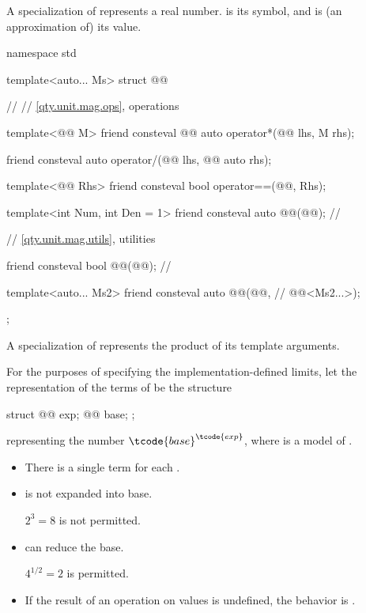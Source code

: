 A specialization of  represents a real number.
 is its symbol, and
 is (an approximation of) its value.

\begin{codeblock}
namespace std {

template<auto... Ms>
struct @@ {  // \expos
  // \ref{qty.unit.mag.ops}, operations

  template<@@ M>
  friend consteval @@ auto operator*(@@ lhs, M rhs);

  friend consteval auto operator/(@@ lhs, @@ auto rhs);

  template<@@ Rhs>
  friend consteval bool operator==(@@, Rhs);

  template<int Num, int Den = 1>
  friend consteval auto @@(@@);                         // \expos

  // \ref{qty.unit.mag.utils}, utilities

  friend consteval bool @@(@@);  // \expos

  template<auto... Ms2>
  friend consteval auto @@(@@,             // \expos
                                         @@<Ms2...>);
};

}
\end{codeblock}

\pnum
A specialization of 
represents the product of its template arguments.

\pnum
For the purposes of specifying the implementation-defined limits,
let the representation of the terms of  be the structure
\begin{codeblock}
struct {
  @@ exp;
  @@ base;
};
\end{codeblock}
representing the number $\tcode{base}^\tcode{exp}$,
where  is a model of .
\begin{itemize}
\item
There is a single term for each .
\item
{} is not expanded into base.
\begin{note}
$2^3 = 8$ is not permitted.
\end{note}
\item
{} can reduce the base.
\begin{note}
$4^{1/2} = 2$ is permitted.
\end{note}
\item
If the result of an operation on  values is undefined,
the behavior is
.
\end{itemize}

